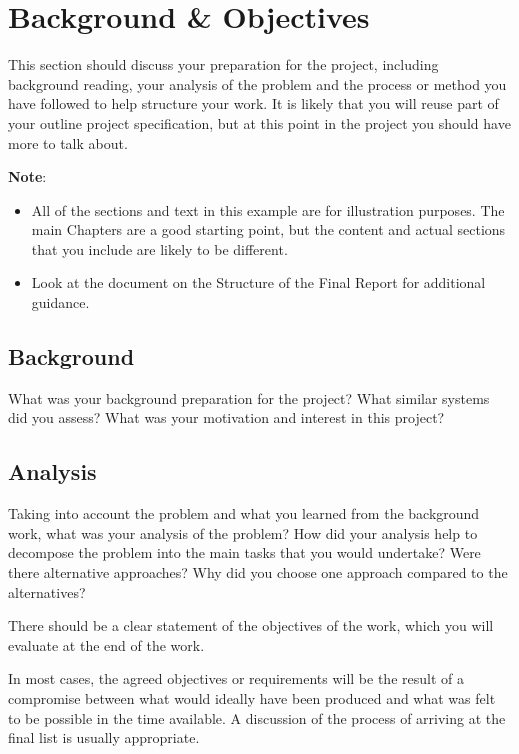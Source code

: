 \chapter{Background \& Objectives}

This section should discuss your preparation for the project, including background reading, your analysis of the problem and the process or method you have followed to help structure your work.  It is likely that you will reuse part of your outline project specification, but at this point in the project you should have more to talk about. 

\textbf{Note}: 

\begin{itemize}
   \item All of the sections and text in this example are for illustration purposes. The main Chapters are a good starting point, but the content and actual sections that you include are likely to be different.
   
   \item Look at the document on the Structure of the Final Report for additional guidance. 
   
\end {itemize}

\section{Background}
What was your background preparation for the project? What similar systems did you assess? What was your motivation and interest in this project? 


\section{Analysis}
Taking into account the problem and what you learned from the background work, what was your analysis of the problem? How did your analysis help to decompose the problem into the main tasks that you would undertake? Were there alternative approaches? Why did you choose one approach compared to the alternatives? 

There should be a clear statement of the objectives of the work, which you will evaluate at the end of the work. 

In most cases, the agreed objectives or requirements will be the result of a compromise between what would ideally have been produced and what was felt to be possible in the time available. A discussion of the process of arriving at the final list is usually appropriate.

